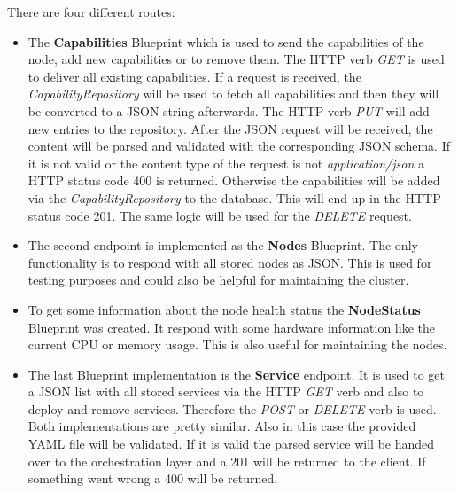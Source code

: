 There are four different routes:
\begin{itemize}
  \item The \textbf{Capabilities} Blueprint which is used to send the capabilities of the node, add new capabilities or to remove them.
  The \ac{HTTP} verb \textit{GET} is used to deliver all existing capabilities.
  If a request is received, the \textit{CapabilityRepository} will be used to fetch all capabilities and then they will be converted to a JSON string afterwards.
  The \ac{HTTP} verb \textit{PUT} will add new entries to the repository.
  After the \ac{JSON} request will be received, the content will be parsed and validated with the corresponding \ac{JSON} schema.
  If it is not valid or the content type of the request is not \textit{application/json} a \ac{HTTP} status code 400 is returned.
  Otherwise the capabilities will be added via the \textit{CapabilityRepository} to the database.
  This will end up in the \ac{HTTP} status code 201.
  The same logic will be used for the \textit{DELETE} request.
  \item The second endpoint is implemented as the \textbf{Nodes} Blueprint.
  The only functionality is to respond with all stored nodes as \ac{JSON}.
  This is used for testing purposes and could also be helpful for maintaining the cluster.
  \item To get some information about the node health status the \textbf{NodeStatus} Blueprint was created.
  It respond with some hardware information like the current \ac{CPU} or memory usage.
  This is also useful for maintaining the nodes.
  \item The last Blueprint implementation is the \textbf{Service} endpoint.
  It is used to get a \ac{JSON} list with all stored services via the \ac{HTTP} \textit{GET} verb and also to deploy and remove services.
  Therefore the \textit{POST} or \textit{DELETE} verb is used.
  Both implementations are pretty similar.
  Also in this case the provided \ac{YAML} file will be validated.
  If it is valid the parsed service will be handed over to the orchestration layer and a 201 will be returned to the client.
  If something went wrong a 400 will be returned.
\end{itemize}

